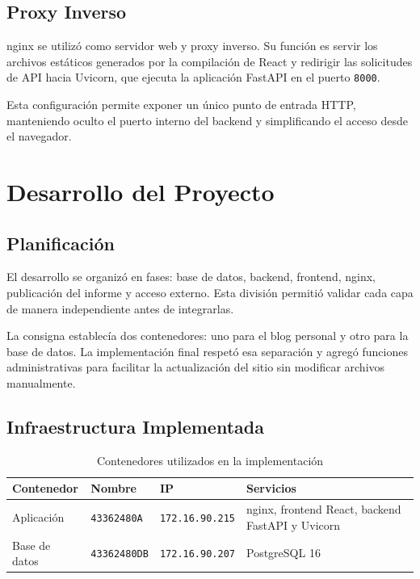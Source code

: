 \documentclass[twoside, 11pt, a4paper]{article}
\begin{document}
    \subsection{Proxy Inverso}

    nginx se utilizó como servidor web y proxy inverso. Su función es servir los archivos estáticos generados por la compilación de React y redirigir las solicitudes de API hacia Uvicorn, que ejecuta la aplicación FastAPI en el puerto \texttt{8000}.

    Esta configuración permite exponer un único punto de entrada HTTP, manteniendo oculto el puerto interno del backend y simplificando el acceso desde el navegador.

    \section{Desarrollo del Proyecto}

    \subsection{Planificación}

    El desarrollo se organizó en fases: base de datos, backend, frontend, nginx, publicación del informe y acceso externo. Esta división permitió validar cada capa de manera independiente antes de integrarlas.

    La consigna establecía dos contenedores: uno para el blog personal y otro para la base de datos. La implementación final respetó esa separación y agregó funciones administrativas para facilitar la actualización del sitio sin modificar archivos manualmente.

    \subsection{Infraestructura Implementada}

    \begin{table}[H]
        \centering
        \begin{tabular}{|l|l|l|p{5.8cm}|}
            \hline
            \textbf{Contenedor} & \textbf{Nombre} & \textbf{IP} & \textbf{Servicios} \\
            \hline
            Aplicación & \texttt{43362480A} & \texttt{172.16.90.215} & nginx, frontend React, backend FastAPI y Uvicorn \\
            \hline
            Base de datos & \texttt{43362480DB} & \texttt{172.16.90.207} & PostgreSQL 16 \\
            \hline
        \end{tabular}
        \caption{Contenedores utilizados en la implementación}
    \end{table}
\end{document}
